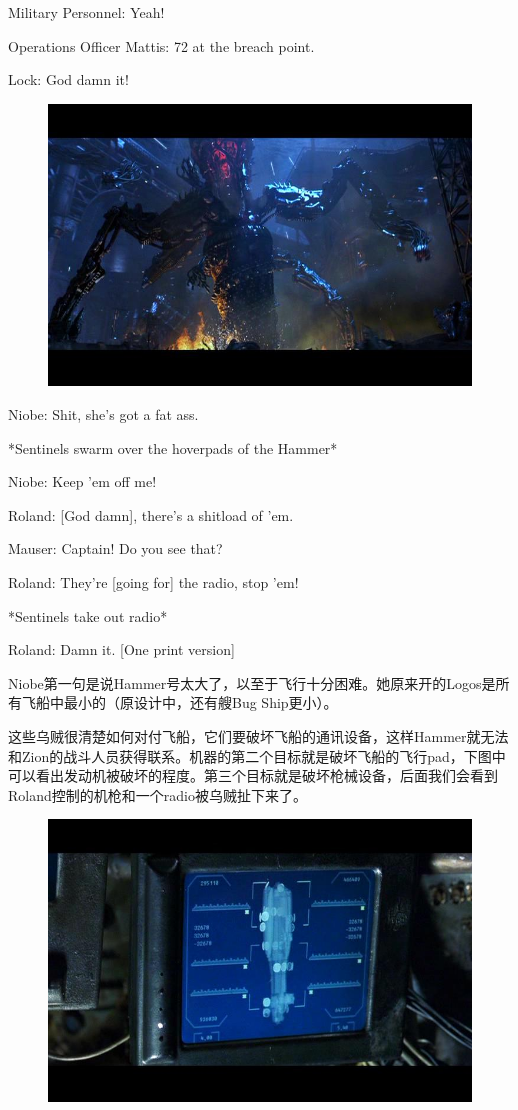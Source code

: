 \documentclass[UTF8]{ctexart}
\newenvironment{myquote}{\color{green} \setlength{\leftskip}{6em} \setlength{\rightskip}{4em} \setlength{\parindent}{-2em}}{\par}
\begin{document}
\begin{myquote}
Military Personnel: Yeah!

Operations Officer Mattis: 72 at the breach point.

Lock: God damn it!
\end{myquote}

\begin{figure}[htb]
\centering
\includegraphics[width=0.5\linewidth]{fig/295cb035588b3a8ba61e12b0.jpg}
\end{figure}

\begin{myquote}
Niobe: Shit, she's got a fat ass.

*Sentinels swarm over the hoverpads of the Hammer*

Niobe: Keep 'em off me!

Roland: [God damn], there's a shitload of 'em.

Mauser: Captain! Do you see that?

Roland: They're [going for] the radio, stop 'em!

*Sentinels take out radio*

Roland: Damn it. [One print version]
\end{myquote}

Niobe第一句是说Hammer号太大了，以至于飞行十分困难。她原来开的Logos是所有飞船中最小的（原设计中，还有艘Bug Ship更小）。

这些乌贼很清楚如何对付飞船，它们要破坏飞船的通讯设备，这样Hammer就无法和Zion的战斗人员获得联系。机器的第二个目标就是破坏飞船的飞行pad，下图中可以看出发动机被破坏的程度。第三个目标就是破坏枪械设备，后面我们会看到Roland控制的机枪和一个radio被乌贼扯下来了。

\begin{figure}[htb]
\centering
\includegraphics[width=0.5\linewidth]{fig/d456960a423f9d1f95ca6bb0.jpg}
\end{figure}
\end{document}
